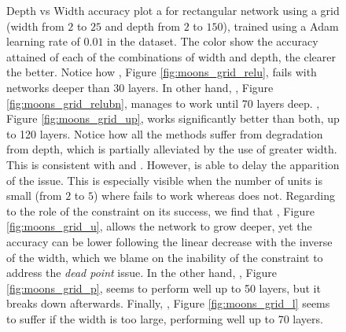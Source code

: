 \begin{figure}
    
  \caption{Depth vs Width accuracy plot a for rectangular network using a grid (width from $2$ to $25$ and depth from $2$ to $150$),  trained using a Adam learning rate of $0.01$ in the \moons dataset. The color show the accuracy attained of each of the combinations of width and depth, the clearer the better. Notice how \ReLU, Figure \ref{fig:moons_grid_relu}, fails with networks deeper than 30 layers. In other hand, \ReLUBN, Figure \ref{fig:moons_grid_relubn}, manages to work until 70 layers deep. \SepUnitPoint,  Figure \ref{fig:moons_grid_up}, works significantly better than both, up to 120 layers. Notice how all the methods suffer from degradation from depth, which is partially alleviated by the use of greater width. This is consistent with \cite{simpnet} and \cite{densenet}. However, \SepUnitPoint is able to delay the apparition of the issue. This is especially visible when the number of units is small (from $2$ to $5$) where \ReLUBN fails to work whereas \SepUnitPoint does not. Regarding to the role of the constraint on its success, we find that \SepUnit, Figure \ref{fig:moons_grid_u}, allows the network to grow deeper, yet the accuracy can be lower following the linear decrease with the inverse of the width, which we blame on the inability of the \SepUnit constraint to address the \emph{dead point} issue. In the other hand, \SepPoint, Figure \ref{fig:moons_grid_p}, seems to perform well up to 50 layers, but it breaks down afterwards. Finally, \SepLayer , Figure \ref{fig:moons_grid_l} seems to suffer if the width is too large, performing well up to 70 layers.}
  \label{fig:moons_grid} 
\end{figure}

